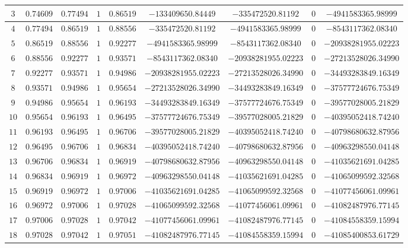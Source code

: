 \begin{enumerate}
{\begin{table}[H]
\begin{tabular}{|c|c|c|c|c|c|c|c|c|}
            $3$ & $0.74609$ & $0.77494$ & $1$ & $0.86519$ & $-133409650.84449$ & $-335472520.81192$ & $0$ & $-4941583365.98999$ \\ \hline
$4$ & $0.77494$ & $0.86519$ & $1$ & $0.88556$ & $-335472520.81192$ & $-4941583365.98999$ & $0$ & $-8543117362.08340$ \\ \hline
$5$ & $0.86519$ & $0.88556$ & $1$ & $0.92277$ & $-4941583365.98999$ & $-8543117362.08340$ & $0$ & $-20938281955.02223$ \\ \hline
$6$ & $0.88556$ & $0.92277$ & $1$ & $0.93571$ & $-8543117362.08340$ & $-20938281955.02223$ & $0$ & $-27213528026.34990$ \\ \hline
$7$ & $0.92277$ & $0.93571$ & $1$ & $0.94986$ & $-20938281955.02223$ & $-27213528026.34990$ & $0$ & $-34493283849.16349$ \\ \hline
$8$ & $0.93571$ & $0.94986$ & $1$ & $0.95654$ & $-27213528026.34990$ & $-34493283849.16349$ & $0$ & $-37577724676.75349$ \\ \hline
$9$ & $0.94986$ & $0.95654$ & $1$ & $0.96193$ & $-34493283849.16349$ & $-37577724676.75349$ & $0$ & $-39577028005.21829$ \\ \hline
$10$ & $0.95654$ & $0.96193$ & $1$ & $0.96495$ & $-37577724676.75349$ & $-39577028005.21829$ & $0$ & $-40395052418.74240$ \\ \hline
$11$ & $0.96193$ & $0.96495$ & $1$ & $0.96706$ & $-39577028005.21829$ & $-40395052418.74240$ & $0$ & $-40798680632.87956$ \\ \hline
$12$ & $0.96495$ & $0.96706$ & $1$ & $0.96834$ & $-40395052418.74240$ & $-40798680632.87956$ & $0$ & $-40963298550.04148$ \\ \hline
$13$ & $0.96706$ & $0.96834$ & $1$ & $0.96919$ & $-40798680632.87956$ & $-40963298550.04148$ & $0$ & $-41035621691.04285$ \\ \hline
$14$ & $0.96834$ & $0.96919$ & $1$ & $0.96972$ & $-40963298550.04148$ & $-41035621691.04285$ & $0$ & $-41065099592.32568$ \\ \hline
$15$ & $0.96919$ & $0.96972$ & $1$ & $0.97006$ & $-41035621691.04285$ & $-41065099592.32568$ & $0$ & $-41077456061.09961$ \\ \hline
$16$ & $0.96972$ & $0.97006$ & $1$ & $0.97028$ & $-41065099592.32568$ & $-41077456061.09961$ & $0$ & $-41082487976.77145$ \\ \hline
$17$ & $0.97006$ & $0.97028$ & $1$ & $0.97042$ & $-41077456061.09961$ & $-41082487976.77145$ & $0$ & $-41084558359.15994$ \\ \hline
$18$ & $0.97028$ & $0.97042$ & $1$ & $0.97051$ & $-41082487976.77145$ & $-41084558359.15994$ & $0$ & $-41085400853.61729$ \\ \hline

\end{tabular}
\end{table}}
\end{enumerate}
